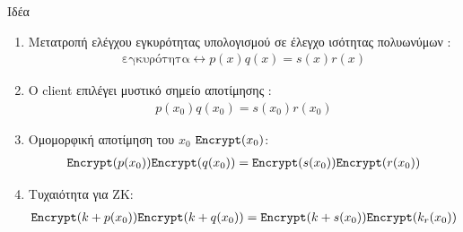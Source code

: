\documentclass[handout]{beamer}
\begin{document}
\begin{frame}{Ιδέα} 
	\begin{tiny}
	\begin{enumerate}
	\item Μετατροπή ελέγχου εγκυρότητας υπολογισμού σε έλεγχο ισότητας πολυωνύμων : 
	\begin{align*}\textrm{εγκυρότητα} \leftrightarrow p(x)q(x)=s(x)r(x) \end{align*} \pause
	\item Ο client επιλέγει μυστικό σημείο αποτίμησης : 
	\begin{align*} p(x_0)q(x_0)=s(x_0)r(x_0) \end{align*} \pause
	\item Ομομορφική αποτίμηση του $x_0$  $\mathtt{Encrypt}(x_0)$:
	\begin{align*}\mathtt{Encrypt}(p(x_0))\mathtt{Encrypt}(q(x_0))=\mathtt{Encrypt}(s(x_0))\mathtt{Encrypt}(r(x_0))
	\end{align*} \pause
	\item Τυχαιότητα για ZK:
	\begin{align*}
	\mathtt{Encrypt}(k+p(x_0))\mathtt{Encrypt}(k+q(x_0))   =\mathtt{Encrypt}(k+s(x_0))\mathtt{Encrypt}(k_ r(x_0))   
	\end{align*}
	\end{enumerate}
	\end{tiny}
\end{frame}
 
\end{document}
